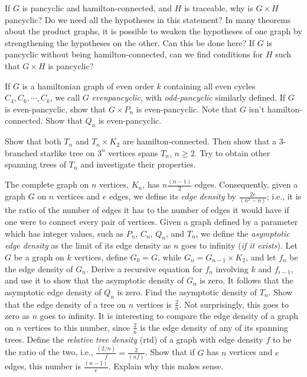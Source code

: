 \documentclass{article}
\begin{document}
\begin{description}
  If $G$ is pancyclic and hamilton-connected, and $H$ is traceable, why is $G \times H$ pancyclic? Do we need all the hypotheses in this statement? In many theorems about the product graphs, it is possible to weaken the hypotheses of one graph by strengthening the hypotheses on the other. Can this be done here? If $G$ is pancyclic without being hamilton-connected, can we find conditions for $H$ such that $G \times H$ is pancyclic?

  If $G$ is a hamiltonian graph of even order $k$ containing all even cycles $C_4,C_6,\cdots,C_k$, we call $G$ \emph{evenpancyclic}, with \emph{odd-pancyclic} similarly defined. If $G$ is even-pancyclic, show that $G \times P_n$ is even-pancyclic. Note that $G$ isn't hamilton-connected. Show that $Q_n$ is even-pancyclic.

\item[35.] Show that both $T_n$ and $T_n \times K_2$ are hamilton-connected. Then show that a $3$-branched starlike tree on $3^n$ vertices spans $T_n$, $n \geq 2$. Try to obtain other spanning trees of $T_n$ and investigate their properties.

\item[36.] The complete graph on $n$ vertices, $K_n$, has $n \frac{(n-1)}{2}$ edges. Consequently, given a graph $G$ on $n$ vertices and $e$ edges, we define its \emph{edge density} by $\frac{2e}{(n^2-n)}$; i.e., it is the ratio of the number of edges it has to the number of edges it would have if one were to connect every pair of vertices. Given a graph defined by a parameter which has integer values, such as $P_n$, $C_n$, $Q_n$, and $T_n$, we define the \emph{asymptotic edge density} as the limit of its edge density as $n$ goes to infinity (\emph{if it exists}). Let $G$ be a graph on $k$ vertices, define $G_0 = G$, while $G_n = G_{n-1} \times K_2$, and let $f_n$ be the edge density of $G_n$. Derive a recursive equation for $f_n$ involving $k$ and $f_{i-1}$, and use it to show that the asymptotic density of $G_n$ is zero. It follows that the asymptotic edge density of $Q_n$ is zero. Find the asymptotic density of $T_n$. Show that the edge density of a tree on $n$ vertices is $\frac{2}{n}$. Not surprisingly, this goes to zero as $n$ goes to infinity. It is interesting to compare the edge density of a graph on $n$ vertices to this number, since $\frac{2}{n}$ is the edge density of any of its spanning trees. Define the \emph{relative tree density} (rtd) of a graph with edge density $f$ to be the ratio of the two, i.e., $\frac{(2/n)}{f} = \frac{2}{(nf)}$. Show that if $G$ has $n$ vertices and $e$ edges, this number is $\frac{(n-1)}{e}$. Explain why this makes sense.


\end{description}
\end{document}
